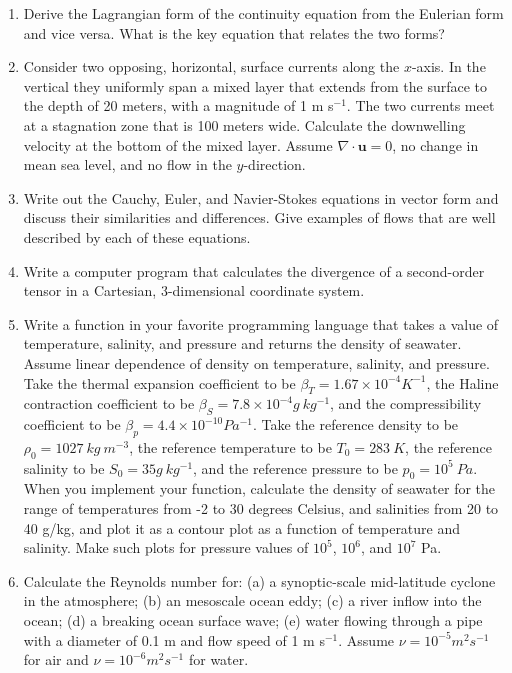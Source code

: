 \documentclass[12pt]{article}
\numberwithin{equation}{section}
\numberwithin{figure}{section}
\numberwithin{table}{section}
\begin{document}
\begin{enumerate}
  \item Derive the Lagrangian form of the continuity equation from
  the Eulerian form and vice versa. What is the key equation that relates the
  two forms?

  \item Consider two opposing, horizontal, surface currents along the $x$-axis.
  In the vertical they uniformly span a mixed layer that extends from the
  surface to the depth of 20 meters, with a magnitude of 1 m s$^{-1}$.
  The two currents meet at a stagnation zone that is 100 meters wide.
  Calculate the downwelling velocity at the bottom of the mixed layer.
  Assume $\nabla \cdot \mathbf{u} = 0$, no change in mean sea level, and no
  flow in the $y$-direction.

  \item Write out the Cauchy, Euler, and Navier-Stokes equations in vector form
  and discuss their similarities and differences.
  Give examples of flows that are well described by each of these equations.

  \item Write a computer program that calculates the divergence of a second-order
  tensor in a Cartesian, 3-dimensional coordinate system.

  \item Write a function in your favorite programming language that takes a
  value of temperature, salinity, and pressure and returns the density of
  seawater. Assume linear dependence of density on temperature, salinity, and
  pressure. Take the thermal expansion coefficient to be $\beta_T = 1.67 \times 10^{-4} K^{-1}$,
  the Haline contraction coefficient to be $\beta_S = 7.8 \times 10^{-4} g\ kg^{-1}$,
  and the compressibility coefficient to be $\beta_p = 4.4 \times 10^{-10} Pa^{-1}$.
  Take the reference density to be $\rho_0 = 1027\ kg\ m^{-3}$, the reference
  temperature to be $T_0 = 283\ K$, the reference salinity to be $S_0 = 35 g\ kg^{-1}$,
  and the reference pressure to be $p_0 = 10^5\ Pa$.
  When you implement your function, calculate the density of seawater for the
  range of temperatures from -2 to 30 degrees Celsius, and salinities from 20 to
  40 g/kg, and plot it as a contour plot as a function of temperature and salinity.
  Make such plots for pressure values of $10^5$, $10^6$, and $10^7$ Pa.

  \item Calculate the Reynolds number for:
  (a) a synoptic-scale mid-latitude cyclone in the atmosphere;
  (b) an mesoscale ocean eddy;
  (c) a river inflow into the ocean;
  (d) a breaking ocean surface wave;
  (e) water flowing through a pipe with a diameter of 0.1 m and flow speed of 1 m s$^{-1}$.
  Assume $\nu = 10^{-5} m^2 s^{-1}$ for air and $\nu = 10^{-6} m^2 s^{-1}$ for water.

\end{enumerate}
\end{document}
